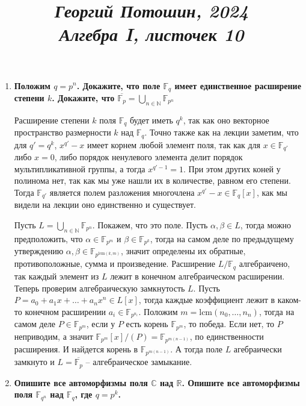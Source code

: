 \documentclass{article}
\title{
\textit{\small{Георгий Потошин, 2024}}\\
\vspace{0.3ex}
\textit{\huge{Алгебра I, листочек 10}}\vspace{1ex}
}
\date{\vspace{-10ex}}
\begin{document}
\maketitle

\begin{enumerate}
    \item \textbf{Положим $q = p^n$. Докажите, что поле $\mathbb{F}_q$ имеет
        единственное расширение степени $k$. Докажите, что $\overline{\mathbb{F}_p}
        =\bigcup_{n\in\mathbb{N}}\mathbb{F}_{p^n}$}

        Расширение степени $k$ поля $\mathbb{F}_q$ будет иметь $q^k$, так как
        оно векторное пространство размерности $k$ над $\mathbb{F}_q$. Точно
        также как на лекции заметим, что для $q'=q^k$, $x^{q'}-x$ имеет корнем
        любой элемент поля, так как для $x\in\mathbb{F}_{q'}$ либо $x=0$, либо
        порядок ненулевого элемента делит порядок мультипликативной группы, а
        тогда $x^{q'-1}=1$. При этом других коней у полинома нет, так как мы
        уже нашли их в количестве, равном его степени. Тогда $\mathbb{F}_{q'}$
        является полем разложения многочлена $x^{q'}-x\in\mathbb{F}_q[x]$, как
        мы видели на лекции оно единственно и существует.

        Пусть $L=\bigcup_{n\in\mathbb{N}}\mathbb{F}_{p^n}$. Покажем, что это
        поле. Пусть $\alpha,\beta\in L$, тогда можно предположить, что $\alpha
        \in\mathbb{F}_{p^m}$ и $\beta\in\mathbb{F}_{p^k}$, тогда на самом деле
        по предыдущему утверждению $\alpha,\beta\in\mathbb{F}_{p^
        {\text{lcm}(k,m)}}$, значит определены их обратные, противоположные,
        сумма и произведение. Расширение $L/\mathbb{F}_q$ алгебраичено, так
        каждый элемент из $L$ лежит в конечном алгебраическом расширении. Теперь
        проверим алгебраическую замкнутость $L$. Пусть $P=a_0+a_1x+\ldots+
        a_nx^n\in L[x]$, тогда каждые коэффициент лежит в каком-то конечном
        расширении $a_i\in\mathbb{F}_{p^{n_i}}$. Положим $m=\text{lcm}(n_0,
        \ldots,n_n)$, тогда на самом деле $P\in\mathbb{F}_{p^m}$, если у $P$
        есть корень $\mathbb{F}_{p^m}$, то победа. Если нет, то $P$ неприводим,
        а значит $\mathbb{F}_{p^m}[x]/(P)=\mathbb{F}_{p^{m(n-1)}}$, по
        единственности расширения. И найдется корень в $\mathbb{F}_{p^{m(n-1)}}$.
        А тогда поле $L$ агебраически замкнуто и $L=\overline{\mathbb{F}_p}$ –
        алгебраическое замыкание.

    \item \textbf{Опишите все автоморфизмы поля $\mathbb{C}$ над $\mathbb{R}$.
        Опишите все автоморфизмы поля $\mathbb{F}_{q^n}$ над $\mathbb{F}_q$,
        где $q=p^k$.}


\end{enumerate}
\end{document}
